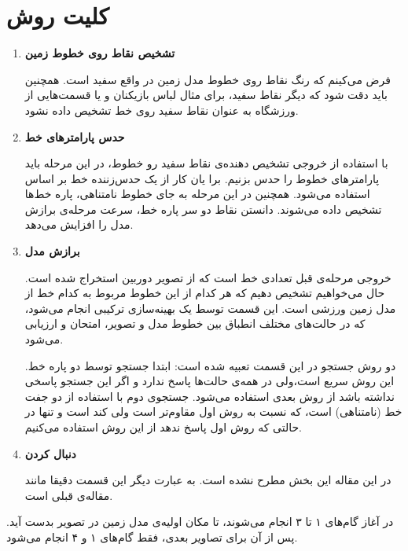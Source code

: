 \documentclass{report}
\begin{document}
\section{کلیت روش}
\begin{enumerate}
\item \textbf{تشخیص نقاط روی خطوط زمین}

فرض می‌کینم که رنگ نقاط روی خطوط مدل زمین در واقع سفید است. همچنین باید دقت شود که دیگر نقاط سفید، برای مثال لباس بازیکنان و یا قسمت‌هایی از ورزشگاه به عنوان نقاط سفید روی خط تشخیص داده نشود.
\item \textbf{حدس پارامترهای خط}

با استفاده از خروجی تشخیص دهنده‌ی نقاط سفید رو خطوط، در این مرحله باید پارامترهای خطوط را حدس بزنیم. برا یان کار از یک حدس‌زننده خط بر اساس  استفاده می‌شود. همچنین در این مرحله به جای خطوط نامتناهی، پاره خط‌ها تشخیص داده می‌شوند. دانستن نقاط دو سر پاره خط، سرعت مرحله‌ی برازش مدل را افزایش می‌دهد.
\item \textbf{برازش مدل}

خروجی مرحله‌ی قبل تعدادی خط است که از تصویر دوربین استخراج شده است. حال می‌خواهیم تشخیص دهیم که هر کدام از این خطوط مربوط به کدام خط از مدل زمین ورزشی است. این قسمت توسط یک بهینه‌سازی ترکیبی انجام می‌شود، که در حالت‌های مختلف انطباق بین خطوط مدل و تصویر، امتحان و ارزیابی می‌شود. 

دو روش جستجو در این قسمت تعبیه شده است: ابتدا جستجو توسط دو پاره خط. این روش سریع است،‌ولی در همه‌ی حالت‌ها پاسخ ندارد و اگر این جستجو پاسخی نداشته باشد از روش بعدی استفاده می‌شود. جستجوی دوم با استفاده از دو جفت خط (نامتناهی) است، که نسبت به روش اول مقاوم‌تر است ولی کند است و تنها در حالتی که روش اول پاسخ ندهد از این روش استفاده می‌کنیم.
\item \textbf{دنبال کردن}

در این مقاله این بخش مطرح نشده است. به عبارت دیگر این قسمت دقیقا مانند مقاله‌ی قبلی\cite{old_paper} است.
\end{enumerate}

در آغاز گام‌های ۱ تا ۳ انجام می‌شوند، تا مکان اولیه‌ی مدل زمین در تصویر بدست آید. پس از آن برای تصاویر بعدی، فقط گام‌های ۱ و ۴ انجام می‌شود.



\begin{latin}
{}

\end{latin}
\end{document}

